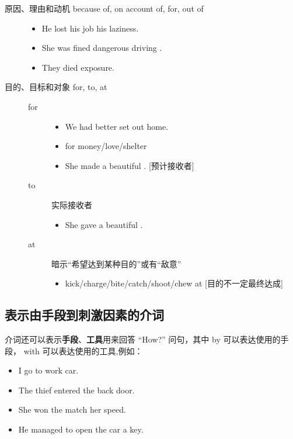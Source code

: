\begin{description}
\item[原因、理由和动机 because of, on account of, for, out of]
  \begin{itemize}
  \item He lost his job  his laziness.
  \item She was fined  dangerous driving .
  \item They died  exposure.
  \end{itemize}
\item[目的、目标和对象 for, to, at]
  \begin{description}

  \item[for]
    \begin{itemize}
    \item We had better set out  home.

    \item for money/love/shelter

    \item She made a beautiful . [预计接收者]
    \end{itemize}

  \item[to] 实际接收者
    \begin{itemize}
    \item She gave a beautiful .
    \end{itemize}

  \item[at] 暗示“希望达到某种目的”或有“敌意”
    \begin{itemize}
    \item kick/charge/bite/catch/shoot/chew at [目的不一定最终达成]
    \end{itemize}
  \end{description}
\end{description}

\subsection{表示由手段到刺激因素的介词}

介词还可以表示\textbf{手段}、\textbf{工具}用来回答 ``How?'' 问句，其中 by 可以表达使用的手
段， with 可以表达使用的工具,例如：
\begin{itemize}
\item I go to work  car.
\item The thief entered  the back door.
\item She won the match  her speed.
\item He managed to open the car  a key.
\end{itemize}

